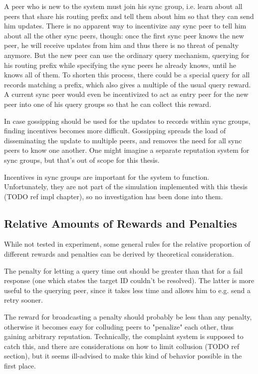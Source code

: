 A peer who is new to the system must join his sync group, i.e. learn about all
peers that share his routing prefix and tell them about him so that they can
send him updates. There is no apparent way to incentivize any sync peer to tell
him about all the other sync peers, though: once the first sync peer knows the
new peer, he will receive updates from him and thus there is no threat of
penalty anymore. But the new peer can use the ordinary query mechanism, querying
for his routing prefix while specifying the sync peers he already knows, until
he knows all of them. To shorten this process, there could be a special query
for all records matching a prefix, which also gives a multiple of the usual
query reward. A current sync peer would even be incentivized to act as entry
peer for the new peer into one of his query groups so that he can collect this
reward.

In case gossipping should be used for the updates to records within sync groups,
finding incentives becomes more difficult. Gossipping spreads the load of
disseminating the update to multiple peers, and removes the need for all sync
peers to know one another. One might imagine a separate reputation system for
sync groups, but that's out of scope for this thesis.

Incentives in sync groups are important for the system to function.
Unfortunately, they are not part of the simulation implemented with this thesis
(TODO ref impl chapter), so no investigation has been done into them.

\subsection{Relative Amounts of Rewards and Penalties}
While not tested in experiment, some general rules for the relative proportion
of different rewards and penalties can be derived by theoretical consideration.

The penalty for letting a query time out should be greater than that for a fail
response (one which states the target ID couldn't be resolved). The latter is
more useful to the querying peer, since it takes less time and allows him to
e.g. send a retry sooner.

The reward for broadcasting a penalty should probably be less than any penalty,
otherwise it becomes easy for colluding peers to "penalize" each other, thus
gaining arbitrary reputation. Technically, the complaint system is supposed to
catch this, and there are considerations on how to limit collusion (TODO ref
section), but it seems ill-advised to make this kind of behavior possible in the
first place.

